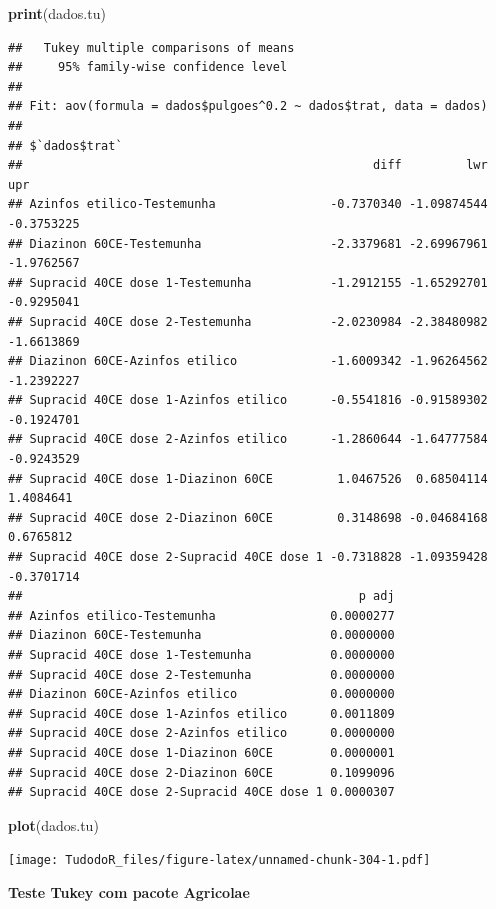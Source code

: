 \documentclass[
]{book}
\newenvironment{Shaded}{\begin{snugshade}}{\end{snugshade}}
\newcommand{\KeywordTok}[1]{\textcolor[rgb]{0.13,0.29,0.53}{\textbf{#1}}}
\newcommand{\NormalTok}[1]{#1}
\begin{document}
\begin{Shaded}
\begin{Highlighting}[]
\KeywordTok{print}\NormalTok{(dados.tu)}
\end{Highlighting}
\end{Shaded}

\begin{verbatim}
##   Tukey multiple comparisons of means
##     95% family-wise confidence level
## 
## Fit: aov(formula = dados$pulgoes^0.2 ~ dados$trat, data = dados)
## 
## $`dados$trat`
##                                                 diff         lwr        upr
## Azinfos etilico-Testemunha                -0.7370340 -1.09874544 -0.3753225
## Diazinon 60CE-Testemunha                  -2.3379681 -2.69967961 -1.9762567
## Supracid 40CE dose 1-Testemunha           -1.2912155 -1.65292701 -0.9295041
## Supracid 40CE dose 2-Testemunha           -2.0230984 -2.38480982 -1.6613869
## Diazinon 60CE-Azinfos etilico             -1.6009342 -1.96264562 -1.2392227
## Supracid 40CE dose 1-Azinfos etilico      -0.5541816 -0.91589302 -0.1924701
## Supracid 40CE dose 2-Azinfos etilico      -1.2860644 -1.64777584 -0.9243529
## Supracid 40CE dose 1-Diazinon 60CE         1.0467526  0.68504114  1.4084641
## Supracid 40CE dose 2-Diazinon 60CE         0.3148698 -0.04684168  0.6765812
## Supracid 40CE dose 2-Supracid 40CE dose 1 -0.7318828 -1.09359428 -0.3701714
##                                               p adj
## Azinfos etilico-Testemunha                0.0000277
## Diazinon 60CE-Testemunha                  0.0000000
## Supracid 40CE dose 1-Testemunha           0.0000000
## Supracid 40CE dose 2-Testemunha           0.0000000
## Diazinon 60CE-Azinfos etilico             0.0000000
## Supracid 40CE dose 1-Azinfos etilico      0.0011809
## Supracid 40CE dose 2-Azinfos etilico      0.0000000
## Supracid 40CE dose 1-Diazinon 60CE        0.0000001
## Supracid 40CE dose 2-Diazinon 60CE        0.1099096
## Supracid 40CE dose 2-Supracid 40CE dose 1 0.0000307
\end{verbatim}

\begin{Shaded}
\begin{Highlighting}[]
\KeywordTok{plot}\NormalTok{(dados.tu)}
\end{Highlighting}
\end{Shaded}

\texttt{[image: TudodoR\_files/figure-latex/unnamed-chunk-304-1.pdf]}

\textbf{Teste Tukey com pacote Agricolae}
\end{document}
